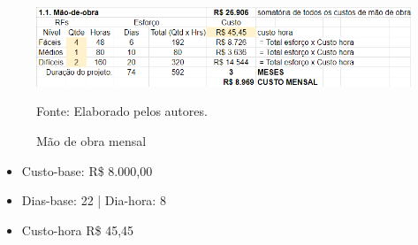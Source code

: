 \documentclass[
    12pt,               %
    openright,          %
    oneside,
    a4paper,            %
    BIBLATEX,           %
    TODO,               %
    english,            %
    brazil              %
    ]{ifsp-spo-inf-ctds}
\begin{document}
            \begin{figure}[H]
                \centering
                \caption{Mão de obra mensal}
                \includegraphics[width=1\textwidth]{images/Mao-de-obra.png}

                \label{fig:maodeobra}
                \centering
                \footnotesize Fonte: Elaborado pelos autores.
            \end{figure}
   \begin{itemize}
      \item Custo-base: R\$ 8.000,00 
        \item Dias-base: 22 | Dia-hora: 8
         \item Custo-hora R\$ 45,45
   \end{itemize} 

           



\end{document}
